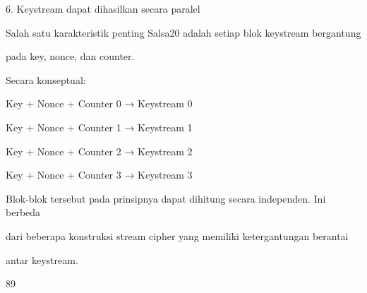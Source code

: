 \documentclass{article}
\begin{document}

6. Keystream dapat dihasilkan secara paralel

Salah satu karakteristik penting Salsa20 adalah setiap blok keystream bergantung 

pada key, nonce, dan counter.

Secara konseptual:

      Key + Nonce + Counter 0 → Keystream 0

      Key + Nonce + Counter 1 → Keystream 1

      Key + Nonce + Counter 2 → Keystream 2

      Key + Nonce + Counter 3 → Keystream 3

Blok-blok tersebut pada prinsipnya dapat dihitung secara independen. Ini berbeda 

dari beberapa konstruksi stream cipher yang memiliki ketergantungan berantai 

antar keystream.

89
\end{document}
